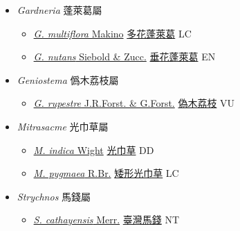 
  \begin{itemize}
 \item[] \textit{Gardneria} 蓬萊葛屬
                    
  \begin{itemize}
        \item[] \href{http://www.theplantlist.org/tpl1.1/search?q=Gardneria+multiflora}{\textit{G. multiflora} Makino}   \href{\detokenize{http://taibnet.sinica.edu.tw/chi/taibnet_species_list.php?T2=多花蓬萊葛&T2_new_value=true&fr=y}}{多花蓬萊葛} LC
        \item[] \href{http://www.theplantlist.org/tpl1.1/search?q=Gardneria+nutans}{\textit{G. nutans} Siebold \& Zucc.}   \href{\detokenize{http://taibnet.sinica.edu.tw/chi/taibnet_species_list.php?T2=垂花蓬萊葛&T2_new_value=true&fr=y}}{垂花蓬萊葛} EN
  \end{itemize}
 \item[] \textit{Geniostema} 僞木荔枝屬
                    
  \begin{itemize}
        \item[] \href{http://www.theplantlist.org/tpl1.1/search?q=Geniostema+rupestre}{\textit{G. rupestre} J.R.Forst. \& G.Forst.}   \href{\detokenize{http://taibnet.sinica.edu.tw/chi/taibnet_species_list.php?T2=偽木荔枝&T2_new_value=true&fr=y}}{偽木荔枝} VU
  \end{itemize}
 \item[] \textit{Mitrasacme} 光巾草屬
                    
  \begin{itemize}
        \item[] \href{http://www.theplantlist.org/tpl1.1/search?q=Mitrasacme+indica}{\textit{M. indica} Wight}   \href{\detokenize{http://taibnet.sinica.edu.tw/chi/taibnet_species_list.php?T2=光巾草&T2_new_value=true&fr=y}}{光巾草} DD
        \item[] \href{http://www.theplantlist.org/tpl1.1/search?q=Mitrasacme+pygmaea}{\textit{M. pygmaea} R.Br.}   \href{\detokenize{http://taibnet.sinica.edu.tw/chi/taibnet_species_list.php?T2=矮形光巾草&T2_new_value=true&fr=y}}{矮形光巾草} LC
  \end{itemize}
 \item[] \textit{Strychnos} 馬錢屬
                    
  \begin{itemize}
        \item[] \href{http://www.theplantlist.org/tpl1.1/search?q=Strychnos+cathayensis}{\textit{S. cathayensis} Merr.}   \href{\detokenize{http://taibnet.sinica.edu.tw/chi/taibnet_species_list.php?T2=臺灣馬錢&T2_new_value=true&fr=y}}{臺灣馬錢} NT
  \end{itemize}
  \end{itemize}

